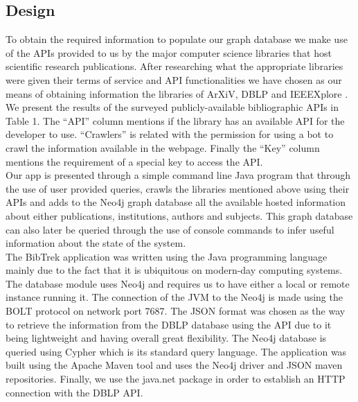 \documentclass[twocolumn]{article}
\begin{document}
\subsection{Design}
To obtain the required information to populate our graph database we make use of the APIs provided to us by the major computer science libraries that host scientific research publications. After researching what the appropriate libraries were given their terms of service and API functionalities we have chosen as our means of obtaining information the libraries of ArXiV, DBLP and IEEEXplore \cite{arxiv, dblp, ieeexplore}. We present the results of the surveyed publicly-available bibliographic APIs in Table 1. The ``API'' column mentions if the library has an available API for the developer to use. ``Crawlers'' is related with the permission for using a bot to crawl the information available in the webpage. Finally the ``Key'' column mentions the requirement of a special key to access the API. \\[1\baselineskip]
Our app is presented through a simple command line Java program that through the use of user provided queries, crawls the libraries mentioned above using their APIs and adds to the Neo4j\cite{neo4j} graph database all the available hosted information about either publications, institutions, authors and subjects. This graph database can also later be queried through the use of console commands to infer useful information about the state of the system.\\[1\baselineskip]
The BibTrek application was written using the Java programming language mainly due to the fact that it is ubiquitous on modern-day computing systems. The database module uses Neo4j and requires us to have either a local or remote instance running it. The connection of the JVM to the Neo4j is made using the BOLT protocol on network port 7687. The JSON format was chosen as the way to retrieve the information from the DBLP database using the API due to it being lightweight and having overall great flexibility. The Neo4j database is queried using Cypher\cite{cypher} which is its standard query language. The application was built using the Apache Maven tool and uses the Neo4j driver and JSON maven repositories. Finally, we use the java.net package in order to establish an HTTP connection with the DBLP API.
\end{document}
